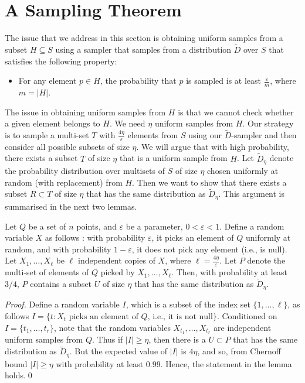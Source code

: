 \documentclass[11pt]{llncs}
\newcommand{\veps}{\varepsilon}
\newcommand{\D}{\tilde{D}}
\begin{document}
\section{A Sampling Theorem}\label{sec:sampling-lemma}

The issue that we address in this section is obtaining uniform samples from a subset $H \subseteq S$ using a sampler that samples from a distribution $\D$ over $S$ that satisfies the following property:
\begin{itemize}
\item For any element $p \in H$, the probability that $p$ is sampled is at least $\frac{\veps}{m}$, where $m = |H|$.
\end{itemize}
The issue in obtaining uniform samples from $H$ is that we cannot check whether a given element belongs to $H$. 
We need $\eta$ uniform samples from $H$.
Our strategy is to sample a multi-set $T$ with $\frac{4\eta}{\veps}$ elements from $S$ using our $\D$-sampler and then consider all possible subsets of size $\eta$. We will argue that with high probability, there exists a subset $T$ of size $\eta$ that is a uniform sample from $H$. 
Let $\D_{\eta}$ denote the probability distribution over multisets of $S$ of size $\eta$ chosen uniformly at random (with replacement) from $H$. Then we want to show that there exists a subset $R \subset T$ of size $\eta$ that has the same distribution as $\D_{\eta}$.
This argument is summarised in the next two lemmas.





\begin{lemma}
\label{lem:clinaba}
Let $Q$ be a set of $n$ points, and $\veps$ be a parameter, $0 < \veps < 1$. Define a random variable $X$ as follows :
with probability $\veps$, it picks an element of $Q$ uniformly at random, and with probability $1-\veps$, it does not
pick any element (i.e., is null). Let $X_1, \ldots, X_\ell$ be $\ell$ independent copies of $X$, where $\ell = \frac{4\eta}{\veps}.$
Let $P$ denote the multi-set of elements of $Q$ picked by $X_1, \ldots, X_\ell$. Then, with probability at least $3/4$,
$P$ contains a subset $U$ of size $\eta$ that has the same distribution as $\D_{\eta}$.
\end{lemma}
\begin{proof}
Define a random variable $I$, which is a subset of the index set $\{1, \ldots, \ell\}$, as follows $I = \{ t : X_t \mbox{ picks an element of $Q$, i.e., it is not null} \}$. 
Conditioned on $I = \{t_1, \ldots, t_r\}$, note that the random variables $X_{t_1}, \ldots, X_{t_r}$ are independent uniform samples from $Q$. 
Thus if $|I| \geq \eta$, then there is a $U \subset P$ that has the same distribution as $\D_{\eta}$. 
But the expected value of $|I|$ is $4 \eta$, and so, from Chernoff bound $|I| \geq \eta$ with probability at least $0.99$. Hence, the statement in the lemma holds.\qed
\end{proof}
\end{document}
